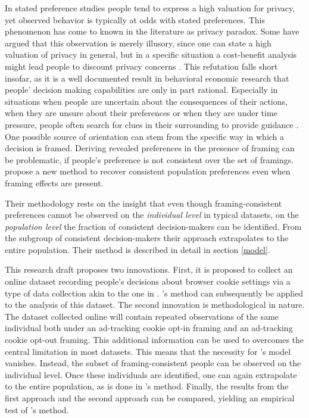 

In stated preference studies people tend to express a high valuation for privacy, yet observed behavior is typically at odds with stated preferences.
This phenomenon has come to known in the literature as privacy paradox. Some have argued that this observation is 
merely illusory, since one can state a high valuation of privacy in general, but in a specific situation a cost-benefit analysis might 
lead people to discount privacy concerns \parencite[p. 2]{acquisti2015privacy}. This refutation falls short insofar, as it is a well documented result in behavioral economic research that people'
decision making capabilities are only in part rational. Especially in situations when people are uncertain about the consequences of their actions, when they are unsure about their preferences or when they 
are under time pressure, people often search for clues in their surrounding to provide guidance \parencite[p. 3]{acquisti2015privacy}. One possible source of 
orientation can stem from the specific way in which a decision is framed. Deriving revealed preferences in the presence of framing can be problematic, if people's preference 
is not consistent over the set of framings. \textcite{goldin2020} propose a new method to recover consistent population preferences even when framing effects are present. 

Their methodology rests on the insight that even though framing-consistent preferences cannot be observed on the \textit{individual level} in typical datasets, 
on the \textit{population level} the fraction of consistent decision-makers can be identified. From the subgroup of consistent decision-makers their approach
extrapolates to the entire population. Their method is described in detail in section \ref{model}.

This research draft proposes two innovations. First, it is proposed to collect an online dataset recording people's decisions about browser cookie settings via a type of data collection
akin to the one in \textcite{levy2020}. \textcite{goldin2020}'s method can subsequently be applied to the analysis of this dataset. The second innovation is methodological in nature.
The dataset collected online will contain repeated observations of the same individual both under an ad-tracking cookie opt-in framing and an ad-tracking cookie opt-out framing.
This additional information can be used to overcomes the central limitation in most datasets. This means that the necessity for \textcite{goldin2020}'s model vanishes.
Instead, the subset of framing-consistent people can be observed on the individual level. Once these individuals are identified, one can again extrapolate to the entire population, as
is done in \textcite{goldin2020}'s method. Finally, the results from the first approach and the second approach can be compared, yielding an empirical test of 
\textcite{goldin2020}'s method.

